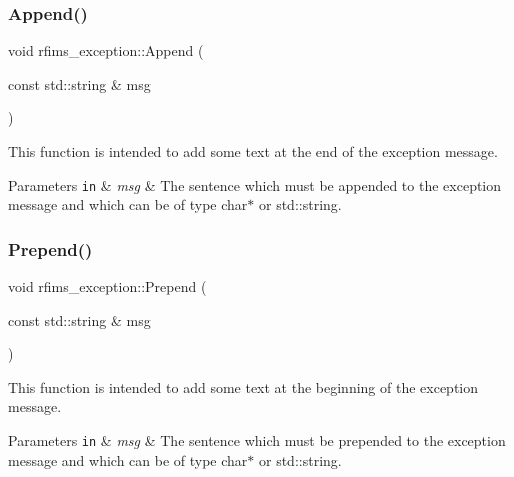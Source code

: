 \subsubsection{\texorpdfstring{Append()}{Append()}}
{\footnotesize\ttfamily void rfims\+\_\+exception\+::\+Append (\begin{DoxyParamCaption}\item[{const std\+::string \&}]{msg }\end{DoxyParamCaption})\hspace{0.3cm}{\ttfamily [inline]}}



This function is intended to add some text at the end of the exception message. 


\begin{DoxyParams}[1]{Parameters}
\mbox{\tt in}  & {\em msg} & The sentence which must be appended to the exception message and which can be of type {\ttfamily char$\ast$} or {\ttfamily std\+::string}. \\
\hline
\end{DoxyParams}
\mbox{\label{classrfims__exception_a78d047f0755c52e6717f32a159addb75}} 
\subsubsection{\texorpdfstring{Prepend()}{Prepend()}}
{\footnotesize\ttfamily void rfims\+\_\+exception\+::\+Prepend (\begin{DoxyParamCaption}\item[{const std\+::string \&}]{msg }\end{DoxyParamCaption})\hspace{0.3cm}{\ttfamily [inline]}}



This function is intended to add some text at the beginning of the exception message. 


\begin{DoxyParams}[1]{Parameters}
\mbox{\tt in}  & {\em msg} & The sentence which must be prepended to the exception message and which can be of type {\ttfamily char$\ast$} or {\ttfamily std\+::string}. \\
\hline
\end{DoxyParams}
\mbox{\label{classrfims__exception_a4c1650baf96931af97f24ad532ba0742}} 
